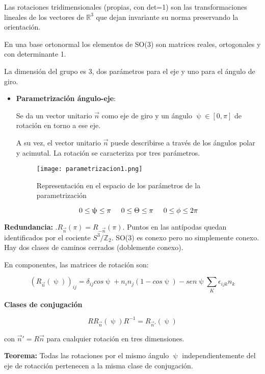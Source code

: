 \documentclass{article}
\begin{document}
Las rotaciones tridimensionales (propias, con det=1) son las transformaciones lineales de los vectores de $\mathds{R}^3$ que dejan invariante su norma preservando la orientación.

En una base ortonormal los elementos de SO(3) son matrices reales, ortogonales y con determinante 1.

La dimensión del grupo es 3, dos parámetros para el eje y uno para el ángulo de giro.

\begin{itemize}
\item \textbf{Parametrización ángulo-eje}:

Se da un vector unitario $\Vec{n}$ como eje de giro y un ángulo $\uppsi \in [0,\pi]$ de rotación en torno a ese eje.

A su vez, el vector unitario $\Vec{n}$ puede describirse a través de los ángulos polar y acimutal. La rotación se caracteriza por tres parámetros.


\begin{figure}[h!]
\centering
\texttt{[image: parametrizacion1.png]}
\caption{Representación en el espacio de los parámetros de la parametrización}
\label{fig:my_label}
\end{figure}

$$0\leq \uppsi \leq \pi \hspace{0.5cm} 0\leq \Theta \leq \pi \hspace{0.5cm}  0\leq \phi \leq 2\pi $$

\end{itemize}
\textbf{Redundancia:} .$R_{\Vec{n}}(\pi) = R_{-\Vec{n}}(\pi) $. Puntos en las antípodas quedan identificados por el cociente $S^3/\mathds{Z}_2$. SO(3) es conexo pero no simplemente conexo. Hay dos clases de caminos cerrados (doblemente conexo).

En componentes, las matrices de rotación son:

$$(R_{\Vec{n}}(\uppsi))_{ij}=\delta _{ij} cos \uppsi + n_in_j (1-cos \uppsi) - sen \uppsi \sum _K \epsilon _{ijk} n_k$$

\newpage
\textbf{Clases de conjugación}

$$RR_{\Vec{n}}(\uppsi ) R^{-1} = R_{\Vec{n}'}(\uppsi)$$

con $\Vec{n}'=R\Vec{n}$ para cualquier rotación en tres dimensiones.

\smallskip
\textbf{Teorema:} Todas las rotaciones por el mismo ángulo $\uppsi$ independientemente del eje de rotacción pertenecen a la misma clase de conjugación.
\end{document}
